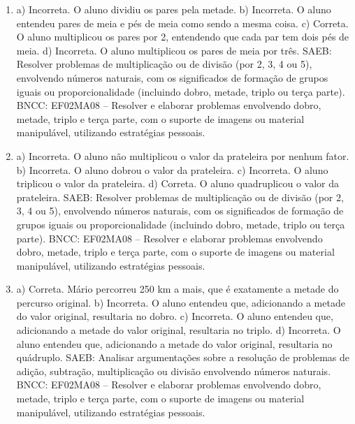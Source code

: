 \begin{enumerate}
\item
a) Incorreta. O aluno dividiu os pares pela metade.
b) Incorreta. O aluno entendeu pares de meia e pés de meia como sendo a
mesma coisa.
c) Correta. O aluno multiplicou os pares por 2, entendendo que cada par
tem dois pés de meia.
d) Incorreta. O aluno multiplicou os pares de meia por três.
SAEB: Resolver problemas de multiplicação ou de divisão (por 2,
3, 4 ou 5), envolvendo números naturais, com os significados de formação
de grupos iguais ou proporcionalidade (incluindo dobro, metade, triplo
ou terça parte).
BNCC: EF02MA08 -- Resolver e elaborar problemas envolvendo dobro, metade, triplo e terça parte,
com o suporte de imagens ou material manipulável, utilizando estratégias
pessoais.

\item
a) Incorreta. O aluno não multiplicou o valor da prateleira por nenhum fator.
b) Incorreta. O aluno dobrou o valor da prateleira.
c) Incorreta. O aluno triplicou o valor da prateleira.
d) Correta. O aluno quadruplicou o valor da prateleira.
SAEB: Resolver problemas de multiplicação ou de divisão (por 2,
3, 4 ou 5), envolvendo números naturais, com os significados de formação
de grupos iguais ou proporcionalidade (incluindo dobro, metade, triplo
ou terça parte).
BNCC: EF02MA08 -- Resolver e elaborar problemas envolvendo dobro, metade, triplo e terça parte,
com o suporte de imagens ou material manipulável, utilizando estratégias
pessoais.

\item
a) Correta. Mário percorreu 250 km a mais, que é exatamente a metade do percurso original.
b) Incorreta. O aluno entendeu que, adicionando a metade do valor original, resultaria no dobro.
c) Incorreta. O aluno entendeu que, adicionando a metade do valor original, resultaria no triplo.
d) Incorreta. O aluno entendeu que, adicionando a metade do valor original, resultaria no quádruplo.
SAEB: Analisar argumentações sobre a resolução de problemas de adição,
subtração, multiplicação ou divisão envolvendo números naturais.
BNCC: EF02MA08 -- Resolver e elaborar problemas envolvendo dobro, metade,
triplo e terça parte, com o suporte de imagens ou material manipulável, utilizando estratégias
pessoais.
\end{enumerate}


